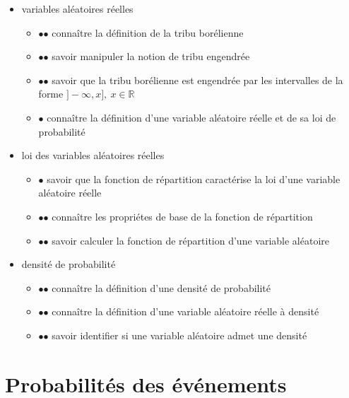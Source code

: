 \begin{itemize}
\item
  variables aléatoires réelles

  \begin{itemize}
  \tightlist
  \item
    $\mathord{\bullet}\mathord{\bullet}$ connaître la définition de la
    tribu borélienne
  \item
    $\mathord{\bullet}\mathord{\bullet}$ savoir manipuler la notion de
    tribu engendrée
  \item
    $\mathord{\bullet}\mathord{\bullet}$ savoir que la tribu borélienne
    est engendrée par les intervalles de la forme
    \(]-\infty, x],~ x\in \mathbb{R}\)
  \item
    $\mathord{\bullet}$ connaître la définition d'une variable aléatoire
    réelle et de sa loi de probabilité
  \end{itemize}
\item
  loi des variables aléatoires réelles

  \begin{itemize}
  \tightlist
  \item
    $\mathord{\bullet}$ savoir que la fonction de répartition
    caractérise la loi d'une variable aléatoire réelle
  \item
    $\mathord{\bullet}\mathord{\bullet}$ connaître les propriétes de
    base de la fonction de répartition
  \item
    $\mathord{\bullet}\mathord{\bullet}$ savoir calculer la fonction de
    répartition d'une variable aléatoire
  \end{itemize}
\item
  densité de probabilité

  \begin{itemize}
  \tightlist
  \item
    $\mathord{\bullet}\mathord{\bullet}$ connaître la définition d'une
    densité de probabilité
  \item
    $\mathord{\bullet}\mathord{\bullet}$ connaître la définition d'une
    variable aléatoire réelle à densité
  \item
    $\mathord{\bullet}\mathord{\bullet}$ savoir identifier si une
    variable aléatoire admet une densité
  \end{itemize}
\end{itemize}

\chapter{Probabilités des
événements}\label{I-probabilituxe9s-des-uxe9vuxe9nements-1}

